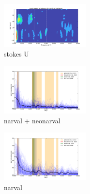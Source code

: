 \documentclass{aa}
\begin{document}
\begin{figure}
    \centering
    \includegraphics[width=0.4\textwidth]{LS stokes U.png}
    \caption{stokes U}
    \label{LS U}
\end{figure}

\begin{figure}
    \centering
    \includegraphics[width=0.4\textwidth]{LS photocentre Narval and Neo Narval.png}
    \caption{narval + neonarval}
    \label{LS narval + neonarval}
\end{figure}

\begin{figure}
    \centering
    \includegraphics[width=0.4\textwidth]{LS photocentre Narval.png}
    \caption{narval}
    \label{LS narval}
\end{figure}
\end{document}
